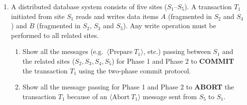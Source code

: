 \documentclass[12pt,a3paper]{article}
\begin{document}
\begin{enumerate}

\item A distributed database system consists of five sites ($S_1$--$S_5$). A transaction $T_1$ initiated from site $S_1$ reads and writes data items $A$ (fragmented in $S_2$ and $S_4$) and $B$ (fragmented in $S_2$, $S_3$ and $S_5$). Any write operation must be performed to all related sites.
\begin{enumerate}
  \item Show all the messages (e.g.\ $\langle\text{Prepare}\ T_1\rangle$, etc.) passing between $S_1$ and the related sites ($S_2, S_3, S_4, S_5$) for Phase 1 and Phase 2 to \textbf{COMMIT} the transaction $T_1$ using the two-phase commit protocol.
  \item Show all the message passing for Phase 1 and Phase 2 to \textbf{ABORT} the transaction $T_1$ because of an $\langle\text{Abort}\ T_1\rangle$ message sent from $S_5$ to $S_1$.
\end{enumerate}

\begin{center}
    

\end{center}
\end{enumerate}
\end{document}
